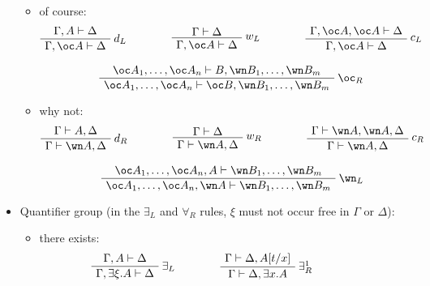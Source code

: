 \begin{itemize}
  \begin{itemize}
  \item
    of course: 
    \begin{gather*}
       \AxRule{ \Gamma, A \vdash \Delta }
       \LabelRule{ d_L }
       \UnaRule{ \Gamma, \oc A \vdash \Delta }
       \DisplayProof
       \qquad\qquad
       \AxRule{ \Gamma \vdash \Delta }
       \LabelRule{ w_L }
       \UnaRule{ \Gamma, \oc A \vdash \Delta }
       \DisplayProof
       \qquad\qquad
       \AxRule{ \Gamma, \oc A, \oc A \vdash \Delta }
       \LabelRule{ c_L }
       \UnaRule{ \Gamma, \oc A \vdash \Delta }
       \DisplayProof
       \\[2ex]
       \AxRule{ \oc A_1, \ldots, \oc A_n \vdash B ,\wn B_1, \ldots, \wn B_m }
       \LabelRule{ \oc_R }
       \UnaRule{ \oc A_1, \ldots, \oc A_n \vdash \oc B ,\wn B_1, \ldots, \wn B_m }
       \DisplayProof      
    \end{gather*}
  \item
    why not:
    \begin{gather*}
      \AxRule{ \Gamma \vdash A, \Delta }
      \LabelRule{ d_R }
      \UnaRule{ \Gamma \vdash \wn A, \Delta }
      \DisplayProof
      \qquad\qquad
      \AxRule{ \Gamma \vdash \Delta }
      \LabelRule{ w_R }
      \UnaRule{ \Gamma \vdash \wn A, \Delta }
      \DisplayProof
      \qquad\qquad
      \AxRule{ \Gamma \vdash \wn A, \wn A, \Delta }
      \LabelRule{ c_R }
      \UnaRule{ \Gamma \vdash \wn A, \Delta }
      \DisplayProof
      \\[2ex]
      \AxRule{ \oc A_1, \ldots, \oc A_n, A \vdash \wn B_1, \ldots, \wn B_m }
      \LabelRule{ \wn_L }
      \UnaRule{ \oc A_1, \ldots, \oc A_n, \wn A \vdash \wn B_1, \ldots, \wn B_m }
      \DisplayProof      
    \end{gather*}
  \end{itemize}
\item
  Quantifier group (in the \(\exists_L\) and \(\forall_R\) rules,
  \(\xi\) must not occur free in \(\Gamma\) or \(\Delta\)):
  \begin{itemize}
  \item
    there exists: 
    \begin{equation*}
      \AxRule{ \Gamma , A \vdash \Delta }
      \LabelRule{ \exists_L }
      \UnaRule{\Gamma, \exists\xi.A \vdash \Delta }
      \DisplayProof
      \qquad\qquad
      \AxRule{ \Gamma \vdash \Delta, A[t/x] }
      \LabelRule{ \exists^1_R }
      \UnaRule{ \Gamma \vdash \Delta, \exists x.A }
      \DisplayProof
      \qquad\qquad
      \AxRule{ \Gamma \vdash \Delta, A[B/X] }

\end{equation*}
\end{itemize}
\end{itemize}
